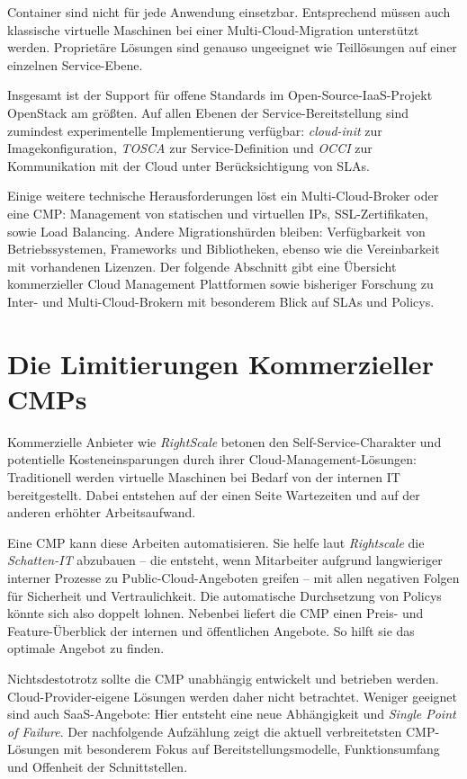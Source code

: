 \noindent
Container sind nicht für jede Anwendung einsetzbar. Entsprechend müssen auch klassische virtuelle Maschinen bei einer Multi-Cloud-Migration unterstützt werden. Proprietäre Lösungen sind genauso ungeeignet wie Teillösungen auf einer einzelnen Service-Ebene.

Insgesamt ist der Support für offene Standards im Open-Source-IaaS-Projekt OpenStack am größten. Auf allen Ebenen der Service-Bereitstellung sind zumindest experimentelle Implementierung verfügbar: \emph{cloud-init} zur Imagekonfiguration, \emph{TOSCA} zur Service-Definition und \emph{OCCI} zur Kommunikation mit der Cloud unter Berücksichtigung von SLAs. 

Einige weitere technische Herausforderungen löst ein Multi-Cloud-Broker oder eine CMP: Management von statischen und virtuellen IPs, SSL-Zertifikaten, sowie Load Balancing. Andere Migrationshürden bleiben: Verfügbarkeit von Betriebssystemen, Frameworks und Bibliotheken, ebenso wie die Vereinbarkeit mit vorhandenen Lizenzen. Der folgende Abschnitt gibt eine Übersicht kommerzieller Cloud Management Plattformen sowie bisheriger Forschung zu Inter- und Multi-Cloud-Brokern mit besonderem Blick auf SLAs und Policys. 

\section{Die Limitierungen Kommerzieller CMPs}

Kommerzielle Anbieter wie \emph{RightScale} betonen den Self-Service-Charakter und potentielle Kosteneinsparungen durch ihrer Cloud-Management-Lösungen: Traditionell werden virtuelle Maschinen bei Bedarf von der internen IT bereitgestellt. Dabei entstehen auf der einen Seite Wartezeiten und auf der anderen erhöhter Arbeitsaufwand. 

Eine CMP kann diese Arbeiten automatisieren. Sie helfe laut \emph{Rightscale} die \emph{Schatten-IT} abzubauen -- die entsteht, wenn Mitarbeiter aufgrund langwieriger interner Prozesse zu Public-Cloud-Angeboten greifen -- mit allen negativen Folgen für Sicherheit und Vertraulichkeit. Die automatische Durchsetzung von Policys könnte sich also doppelt lohnen. Nebenbei liefert die CMP einen Preis- und Feature-Überblick der internen und öffentlichen Angebote. So hilft sie das optimale Angebot zu finden.

Nichtsdestotrotz sollte die CMP unabhängig entwickelt und betrieben werden. Cloud-Provider-eigene Lösungen werden daher nicht betrachtet. Weniger geeignet sind auch SaaS-Angebote: Hier entsteht eine neue Abhängigkeit und \emph{Single Point of Failure}. Der nachfolgende Aufzählung zeigt die aktuell verbreitetsten CMP-Lösungen mit besonderem Fokus auf Bereitstellungsmodelle, Funktionsumfang und Offenheit der Schnittstellen.

